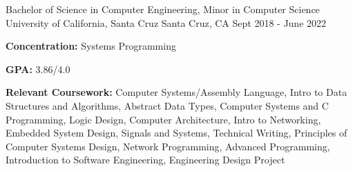 
\begin{cventries}
  \cventry
    {Bachelor of Science in Computer Engineering, Minor in Computer Science} %
    {University of California, Santa Cruz} %
    {Santa Cruz, CA} %
    {Sept 2018 - June 2022} %
    {
    \begin{cvitems}
        \item {\textbf{Concentration:} Systems Programming}
        \vspace{0.5mm}
        \item {\textbf{GPA:} 3.86/4.0}
        \item {\textbf{Relevant Coursework:} Computer Systems/Assembly Language, Intro to Data Structures and Algorithms, Abstract Data Types, Computer Systems and C Programming, Logic Design, Computer Architecture, Intro to Networking, Embedded System Design, Signals and Systems, Technical Writing, Principles of Computer Systems Design, Network Programming, Advanced Programming, Introduction to Software Engineering, Engineering Design Project}
    \end{cvitems}
    }
\end{cventries}
